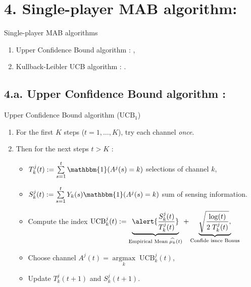 \documentclass[12pt,english,ignorenonframetext,]{beamer}
\providecommand{\tightlist}{%
  \setlength{\itemsep}{0pt}\setlength{\parskip}{0pt}}
\begin{document}
\section{\hfill{}4. Single-player MAB algorithm: \klUCB\hfill{}}

\begin{frame}{Single-player MAB algorithms}

\begin{enumerate}
\def\labelenumi{\arabic{enumi}.}
\tightlist
\item
  Upper Confidence Bound algorithm : \UCB,\vspace*{15pt}
\item
  Kullback-Leibler UCB algorithm : \klUCB.
\end{enumerate}

\end{frame}



\subsection{\hfill{}4.a. Upper Confidence Bound algorithm : \UCB\hfill{}}

\begin{frame}{Upper Confidence Bound algorithm (\(\mathrm{UCB}_1\))}

\begin{enumerate}
\def\labelenumi{\arabic{enumi}.}
\tightlist
\item
  For the first \(K\) steps (\(t=1,\dots,K\)), try each channel
  \emph{once}.
\item
  Then for the next steps \(t > K\) :

  \begin{itemize}
  \tightlist
  \item
  \(T_k^j(t) := \sum\limits_{s=1}^{t} \mathbbm{1}(A^j(s) = k)\) selections of channel \(k\),
  \item
  \(S_k^j(t) := \sum\limits_{s=1}^{t} Y_{k}(s) \mathbbm{1}(A^j(s) = k)\) sum of sensing information.
  \item
    Compute the index
    \(\mathrm{UCB}_k^j(t) := \underbrace{\alert{\frac{S_k^j(t)}{T_k^j(t)}}}_{\text{Empirical Mean}\; \widehat{\mu_k}(t)} + \underbrace{\sqrt{\frac{\log(t)}{2 \; T_k^j(t)}},}_{\text{Confide isnce Bonus}}\)
  \item
    Choose channel \(A^j(t) = \mathop{\arg\max}\limits_{k} \; \mathrm{UCB}_k^j(t)\),
  \item
    Update \(T_k^j(t+1)\) and \(S_k^j(t+1)\).
  \end{itemize}
\end{enumerate}


\end{frame}
\end{document}
